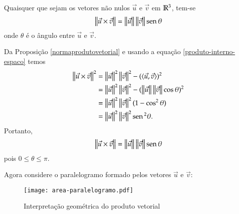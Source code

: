 \begin{proposicao}
  Quaisquer que sejam os vetores n\~ao nulos $\vec{u}$ e $\vec{v}$ em $\mathbb{R}^3$, tem-se
  \[
    \left\Vert{\vec{u}\times\vec{v}}\right\Vert = \left\Vert{\vec{u}}\right\Vert\left\Vert{\vec{v}}\right\Vert{\rm sen\,}\theta
  \]
  onde $\theta$ \'e o \^angulo entre $\vec{u}$ e $\vec{v}$.
\end{proposicao}
\begin{prova}
  Da Proposi\c{c}\~ao \ref{normaprodutovetorial}  e usando a equa\c{c}\~ao \eqref{produto-interno-espaco} temos
  \begin{align*}
    \left\Vert{\vec{u}\times\vec{v}}\right\Vert^2 &= \left\Vert{\vec{u}}\right\Vert^2\left\Vert{\vec{v}}\right\Vert^2 - (\langle \vec{u}, \vec{v} \rangle)^2\\ &= \left\Vert{\vec{u}}\right\Vert^2\left\Vert{\vec{v}}\right\Vert^2 - (\left\Vert{\vec{u}}\right\Vert\left\Vert{\vec{v}}\right\Vert\cos\theta)^2\\ &= \left\Vert{\vec{u}}\right\Vert^2\left\Vert{\vec{v}}\right\Vert^2(1 - \cos^2\theta)\\ &= \left\Vert{\vec{u}}\right\Vert^2\left\Vert{\vec{v}}\right\Vert^2{\rm sen\,}^2\theta.
  \end{align*}
  Portanto,
  \[
    \left\Vert{\vec{u}\times\vec{v}}\right\Vert = \left\Vert{\vec{u}}\right\Vert\left\Vert{\vec{v}}\right\Vert{\rm sen\,}\theta
  \]
  pois $0 \le \theta \le \pi$.
\end{prova}

Agora considere o paralelogramo formado pelos vetores $\vec{u}$ e $\vec{v}$:
\begin{figure}[!h]
  \centering
  \caption{Interpreta\c{c}\~ao geom\'etrica do produto vetorial}
  \texttt{[image: area-paralelogramo.pdf]}





\end{figure}

